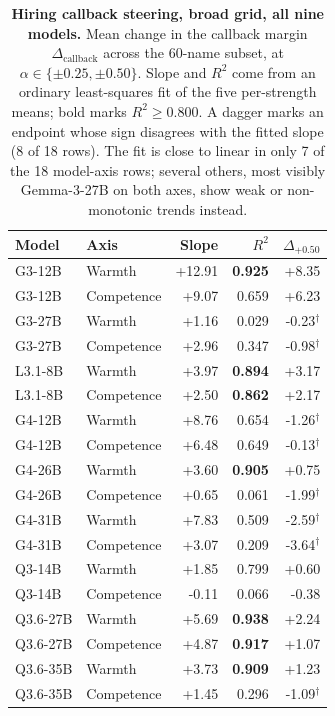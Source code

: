 \begin{table}[H]
\centering
\scriptsize
\setlength{\tabcolsep}{2pt}
\begin{tabular}{@{}llrrr@{}}
\toprule
Model & Axis & Slope & $R^2$ & $\Delta_{+0.50}$ \\
\midrule
G3-12B & Warmth & +12.91 & \textbf{0.925} & +8.35 \\
G3-12B & Competence & +9.07 & 0.659 & +6.23 \\
G3-27B & Warmth & +1.16 & 0.029 & -0.23$^{\dagger}$ \\
G3-27B & Competence & +2.96 & 0.347 & -0.98$^{\dagger}$ \\
L3.1-8B & Warmth & +3.97 & \textbf{0.894} & +3.17 \\
L3.1-8B & Competence & +2.50 & \textbf{0.862} & +2.17 \\
G4-12B & Warmth & +8.76 & 0.654 & -1.26$^{\dagger}$ \\
G4-12B & Competence & +6.48 & 0.649 & -0.13$^{\dagger}$ \\
G4-26B & Warmth & +3.60 & \textbf{0.905} & +0.75 \\
G4-26B & Competence & +0.65 & 0.061 & -1.99$^{\dagger}$ \\
G4-31B & Warmth & +7.83 & 0.509 & -2.59$^{\dagger}$ \\
G4-31B & Competence & +3.07 & 0.209 & -3.64$^{\dagger}$ \\
Q3-14B & Warmth & +1.85 & 0.799 & +0.60 \\
Q3-14B & Competence & -0.11 & 0.066 & -0.38 \\
Q3.6-27B & Warmth & +5.69 & \textbf{0.938} & +2.24 \\
Q3.6-27B & Competence & +4.87 & \textbf{0.917} & +1.07 \\
Q3.6-35B & Warmth & +3.73 & \textbf{0.909} & +1.23 \\
Q3.6-35B & Competence & +1.45 & 0.296 & -1.09$^{\dagger}$ \\
\bottomrule
\end{tabular}
\caption{\textbf{Hiring callback steering, broad grid, all nine models.} Mean change in the callback margin $\Delta_{\text{callback}}$ across the 60-name subset, at $\alpha\in\{\pm0.25,\pm0.50\}$. Slope and $R^2$ come from an ordinary least-squares fit of the five per-strength means; bold marks $R^2\ge0.800$. A dagger marks an endpoint whose sign disagrees with the fitted slope (8 of 18 rows). The fit is close to linear in only 7 of the 18 model-axis rows; several others, most visibly Gemma-3-27B on both axes, show weak or non-monotonic trends instead.}
\label{tab:hiring_steering_slopes}
\end{table}
